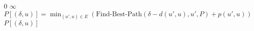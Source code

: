 \begin{questions}
\begin{soln}
		\newpage

		\begin{algorithmic}[1]
			\State \Return $0$
			\EndIf
			\State \Return $\infty$
			\EndIf
			\State $P[(\delta, u)] = \min_{(u', u) \in E}(\text{Find-Best-Path}(\delta - d(u', u), u', P) + p(u', u))$
			\EndIf
			\State \Return $P[(\delta, u)]$
			\EndProcedure
		\end{algorithmic}

	\end{soln}




\end{questions}
